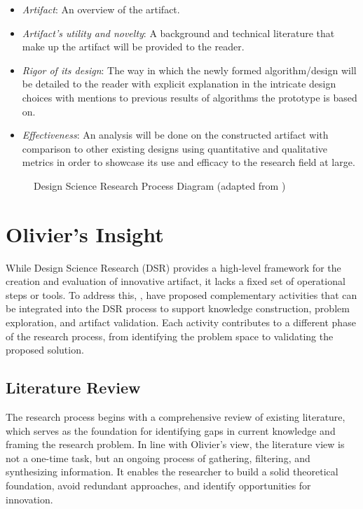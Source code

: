 \begin{enumerate}
\begin{itemize}
        \item \textit{Artifact}: An overview of the artifact.
        \item \textit{Artifact's utility and novelty}: A background and technical literature that make up the artifact will be provided to the reader.
        \item \textit{Rigor of its design}: The way in which the newly formed algorithm/design will be detailed to the reader with explicit explanation in the intricate design choices with mentions to previous results of algorithms the prototype is based on.
        \item \textit{Effectiveness}: An analysis will be done on the constructed artifact with comparison to other existing designs using quantitative and qualitative metrics in order to showcase its use and efficacy to the research field at large.
    \end{itemize}
\end{enumerate}

\begin{figure}[H] %
	\centering %
	\caption{Design Science Research Process Diagram (adapted from \cite{hevner2004design})}
	\label{fig:dsr} %
\end{figure}

\section{Olivier's Insight}
While Design Science Research (DSR) provides a high-level framework for the creation and evaluation of innovative artifact, it lacks a fixed set of operational steps or tools. To address this, \cite{olivier2009information}, have proposed complementary activities that can be integrated into the DSR process to support knowledge construction, problem exploration, and artifact validation. Each activity contributes to a different phase of the research process, from identifying the problem space to validating the proposed solution. \bigskip

\subsection{Literature Review}
\noindent The research process begins with a comprehensive review of existing literature, which serves as the foundation for identifying gaps in current knowledge and framing the research problem. In line with Olivier's view, the literature view is not a one-time task, but an ongoing process of gathering, filtering, and synthesizing information. It enables the researcher to build a solid theoretical foundation, avoid redundant approaches, and identify opportunities for innovation. \bigskip


